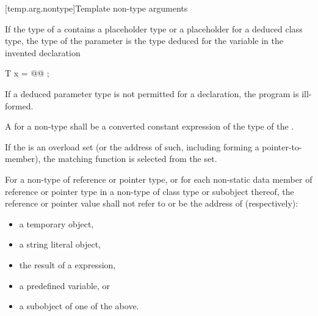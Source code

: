 [temp.arg.nontype]{Template non-type arguments}

\pnum
If the type  of a 
contains a placeholder type
or a placeholder for a deduced class type,
the type of the parameter is the type deduced
for the variable  in the invented declaration
\begin{codeblock}
T x = @@ ;
\end{codeblock}
If a deduced parameter type is not permitted
for a  declaration,
the program is ill-formed.

\pnum
A 
for a non-type 
shall be a converted constant expression
of the type of the .
\begin{note}
If the 
is an overload set
(or the address of such, including forming a pointer-to-member),
the matching function is selected from the set.
\end{note}

\pnum
For a non-type  of reference or pointer type,
or for each non-static data member of reference or pointer type
in a non-type  of class type or subobject thereof,
the reference or pointer value shall not refer to
or be the address of (respectively):
\begin{itemize}
\item a temporary object,
\item a string literal object,
\item the result of a  expression,
\item a predefined  variable, or
\item a subobject of one of the above.
\end{itemize}

